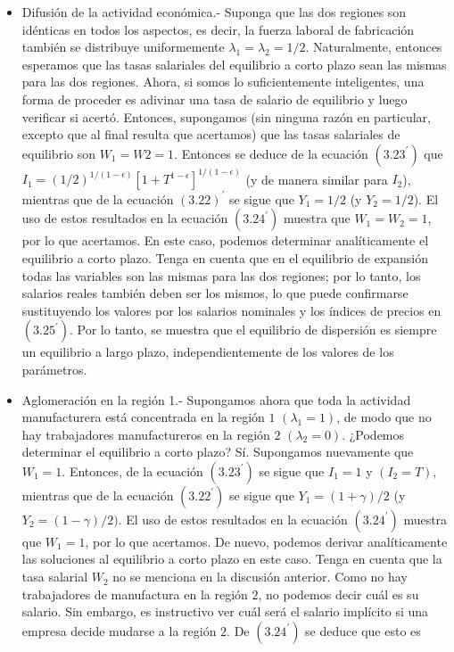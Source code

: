 \begin{itemize}
    \item Difusión de la actividad económica.-  Suponga que las dos regiones son idénticas en todos los aspectos, es decir, la fuerza laboral de fabricación también se distribuye uniformemente $\lambda_1 = \lambda_2 = 1/2$. Naturalmente, entonces esperamos que las tasas salariales del equilibrio a corto plazo sean las mismas para las dos regiones. Ahora, si somos lo suficientemente inteligentes, una forma de proceder es adivinar una tasa de salario de equilibrio y luego verificar si acertó. Entonces, supongamos (sin ninguna razón en particular, excepto que al final resulta que acertamos) que las tasas salariales de equilibrio son $W_1 = W2 = 1$. Entonces se deduce de la ecuación $(3.23^{'})$ que $I_1 = (1/2 )^{1/(1-\epsilon)}[1 + T^{1-\epsilon}]^{1/(1-\epsilon)}$ (y de manera similar para $I_2$), mientras que de la ecuación $(3.22)^{'}$ se sigue que $Y_1 =  1/2$ (y $Y_2 = 1/2$). El uso de estos resultados en la ecuación $(3.24^{'})$ muestra que $W_1 = W_2 = 1$, por lo que acertamos. En este caso, podemos determinar analíticamente el equilibrio a corto plazo. Tenga en cuenta que en el equilibrio de expansión todas las variables son las mismas para las dos regiones; por lo tanto, los salarios reales también deben ser los mismos, lo que puede confirmarse sustituyendo los valores por los salarios nominales y los índices de precios en $(3.25^{'})$. Por lo tanto, se muestra que el equilibrio de dispersión es siempre un equilibrio a largo plazo, independientemente de los valores de los parámetros.
    \item Aglomeración en la región 1.- Supongamos ahora que toda la actividad manufacturera está concentrada en la región $1$ $(\lambda_1 = 1)$, de modo que no hay trabajadores manufactureros en la región $2$ $(\lambda_2 = 0)$. ¿Podemos determinar el equilibrio a corto plazo? Sí. Supongamos nuevamente que $W_1 = 1$. Entonces, de la ecuación $(3.23^{'})$ se sigue que $I_1 = 1$ y $(I_2 = T)$, mientras que de la ecuación $(3.22^{'})$ se sigue que $Y_1 = (1 + \gamma)/2$ (y $Y_2 = (1 - \gamma)/2)$. El uso de estos resultados en la ecuación $(3.24^{'})$ muestra que $W_1 = 1$, por lo que acertamos. De nuevo, podemos derivar analíticamente las soluciones al equilibrio a corto plazo en este caso. Tenga en cuenta que la tasa salarial $W_2$ no se menciona en la discusión anterior. Como no hay trabajadores de manufactura en la región $2$, no podemos decir cuál es su salario. Sin embargo, es instructivo ver cuál será el salario implícito si una empresa decide mudarse a la región $2$. De $(3.24^{'})$ se deduce que esto es


\end{itemize}
